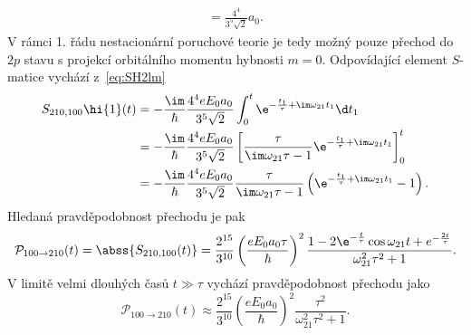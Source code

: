 \begin{solution}
\begin{subequations}
\begin{align}
                =\frac{4^{4}}{3^{5}\sqrt{2}}a_{0}.
        \end{align}            
    \end{subequations}
    V rámci 1. řádu nestacionární poruchové teorie je tedy možný pouze přechod do $2p$ stavu s projekcí orbitálního momentu hybnosti $m=0$.
    Odpovídající element $S$-matice vychází z~\eqref{eq:SH2lm}
    \begin{align}
        S_{210,100}\hi{1}(t)
            &=-\frac{\im}{\hbar}\frac{4^{4}eE_{0}a_{0}}{3^{5}\sqrt{2}}\int_{0}^{t}\e^{-\frac{t_{1}}{\tau}+\im\omega_{21}t_{1}}\d t_{1}\nonumber\\
            &=-\frac{\im}{\hbar}\frac{4^{4}eE_{0}a_{0}}{3^{5}\sqrt{2}}\left[\frac{\tau}{\im\omega_{21}\tau-1}\e^{-\frac{t_{1}}{\tau}+\im\omega_{21}t_{1}}\right]_{0}^{t}\nonumber\\
            &=-\frac{\im}{\hbar}\frac{4^{4}eE_{0}a_{0}}{3^{5}\sqrt{2}}\frac{\tau}{\im\omega_{21}\tau-1}\left(\e^{-\frac{t_{1}}{\tau}+\im\omega_{21}t_{1}}-1\right).
    \end{align}
    Hledaná pravděpodobnost přechodu je pak
    \begin{equation}
        \mathcal{P}_{100\rightarrow210}(t)
            =\abss{S_{210,100}(t)}
            =\frac{2^{15}}{3^{10}}\left(\frac{eE_{0}a_{0}\tau}{\hbar}\right)^{2}\frac{1-2\e^{-\frac{t}{\tau}}\cos{\omega_{21}t}+e^{-\frac{2t}{\tau}}}{\omega_{21}^{2}\tau^{2}+1}.
    \end{equation}
    V limitě velmi dlouhých časů $t\gg\tau$ vychází pravděpodobnost přechodu jako
    \begin{equation}
        \mathcal{P}_{100\rightarrow210}(t)
            \approx\frac{2^{15}}{3^{10}}\left(\frac{eE_{0}a_{0}}{\hbar}\right)^{2}\frac{\tau^{2}}{\omega_{21}^{2}\tau^{2}+1}.
    \end{equation}
\end{solution}